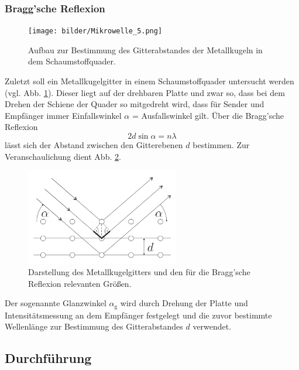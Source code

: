 		\subsubsection*{Bragg'sche Reflexion}
		\begin{figure}[ht]
			\centering
			\texttt{[image: bilder/Mikrowelle\_5.png]}
			\caption{Aufbau zur Bestimmung des Gitterabstandes der Metallkugeln in dem Schaumstoffquader.\cite{WWU}}
			\label{fig:Aufbau5}	
		\end{figure}
		Zuletzt soll ein Metallkugelgitter in einem Schaumstoffquader untersucht werden (vgl. Abb. \ref{fig:Aufbau5}). 
		Dieser liegt auf der drehbaren Platte und zwar so, dass bei dem Drehen der Schiene der Quader so mitgedreht wird, dass für Sender und Empfänger immer Einfallswinkel $\alpha$ = Ausfallswinkel gilt.
		Über die Bragg'sche Reflexion
		\begin{equation} \label{eq:bragg}
			2d\sin{\alpha} = n\lambda
		\end{equation}
		lässt sich der Abstand zwischen den Gitterebenen $d$ bestimmen.
		Zur Veranschaulichung dient Abb. \ref{fig:bragg}.
		\begin{figure}[ht]
			\centering
			\includegraphics[width=0.6\textwidth]{bilder/Bragg.png}
			\caption{Darstellung des Metallkugelgitters und den für die Bragg'sche Reflexion relevanten Größen.\cite{WWU}}
			\label{fig:bragg}	
		\end{figure}
		Der sogenannte Glanzwinkel $\alpha_\text{g}$ wird durch Drehung der Platte und Intensitätsmessung an dem Empfänger festgelegt und die zuvor bestimmte Wellenlänge zur Bestimmung des Gitterabstandes $d$ verwendet. 
		
	\subsection{Durchführung}
	
